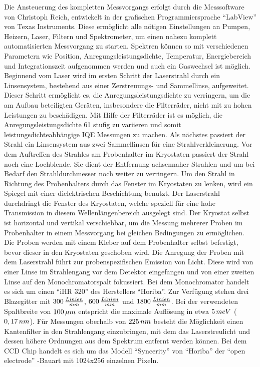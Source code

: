 \newline
Die Ansteuerung des kompletten Messvorgangs erfolgt durch die Messsoftware von Christoph Reich, entwickelt in der grafischen Programmiersprache "`LabView"' von Texas Instruments. Diese ermöglicht alle nötigen Einstellungen an Pumpen, Heizern, Laser, Filtern und Spektrometer, um einen nahezu komplett automatisierten Messvorgang zu starten. Spektren können so mit verschiedenen Parametern wie Position, Anregungsleistungsdichte, Temperatur, Energiebereich und Integrationszeit aufgenommen werden und auch ein Gaswechsel ist möglich.
\newline
Beginnend vom Laser wird im ersten Schritt der Laserstrahl durch ein Linsensystem, bestehend aus einer Zerstreuungs- und Sammellinse, aufgeweitet. Dieser Schritt ermöglicht es, die Anregungsleistungsdichte zu verringern, um die am Aufbau beteiligten Geräten, insbesondere die Filterräder, nicht mit zu hohen Leistungen zu beschädigen. Mit Hilfe der Filterräder ist es möglich, die Anregungsleistungsdichte 61 stufig zu variieren und somit leistungsdichteabhängige IQE Messungen zu machen. Als nächstes passiert der Strahl ein Linsensystem aus zwei Sammellinsen für eine Strahlverkleinerung. Vor dem Auftreffen des Strahles am Probenhalter im Kryostaten passiert der Strahl noch eine Lochblende. Sie dient der Entfernung achsennaher Strahlen und um bei Bedarf den Strahldurchmesser noch weiter zu verringern. 
\newline
Um den Strahl in Richtung des Probenhalters durch das Fenster im Kryostaten zu lenken, wird ein Spiegel mit einer dielektrischen Beschichtung benutzt. Der Laserstrahl durchdringt die Fenster des Kryostaten, welche speziell für eine hohe Transmission in diesem Wellenlängenbereich ausgelegt sind. Der Kryostat selbst ist horizontal und vertikal verschiebbar, um die Messung mehrerer Proben im Probenhalter in einem Messvorgang bei gleichen Bedingungen zu ermöglichen. Die Proben werden mit einem Kleber auf dem Probenhalter selbst befestigt, bevor dieser in den Kryostaten geschoben wird. 
Die Anregung der Proben mit dem Laserstrahl führt zur probenspezifischen Emission von Licht. Diese wird von einer Linse im Strahlengang vor dem Detektor eingefangen und von einer zweiten Linse auf den Monochromatorspalt fokussiert.
\newline
Bei dem Monochromator handelt es sich um einen "`iHR 320"' des Herstellers "`Horiba"'. Zur Verfügung stehen drei Blazegitter mit $300 \thinspace \frac{Linien}{mm}$,
$600 \thinspace \frac{Linien}{mm}$ und $1800 \thinspace \frac{Linien}{mm}$. Bei der verwendeten Spaltbreite von $100 \thinspace \mu m$ entspricht die maximale Auflösung in etwa $5 \thinspace meV$ ($0,17 \thinspace nm$). Für Messungen oberhalb von $225 \thinspace nm$ besteht die Möglichkeit einen Kantenfilter in den Strahlengang einzubringen, mit dem das Laserstreulicht und dessen höhere Ordnungen aus dem Spektrum entfernt werden können. Bei dem CCD Chip handelt es sich um das Modell "`Syncerity"' von "`Horiba"' der "`open electrode"' -Bauart mit 1024x256 einzelnen Pixeln. 


